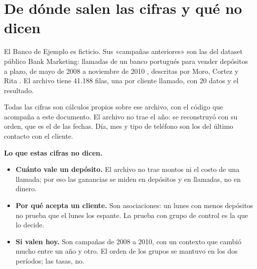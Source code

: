 \documentclass[10pt,a4paper]{article}
\begin{document}
\begin{bloque}
\end{bloque}

\newpage
\section{De dónde salen las cifras y qué no dicen}\label{sec:datos}

El Banco de Ejemplo es ficticio. Sus «campañas anteriores» son las del dataset público
Bank Marketing: llamadas de un banco portugués para vender depósitos a plazo, de mayo de
2008 a noviembre de 2010 , descritas por Moro, Cortez y Rita . El
archivo tiene 41.188 filas, una por cliente llamado, con 20 datos y el resultado.

Todas las cifras son cálculos propios sobre ese archivo, con el código que acompaña a este
documento. El archivo no trae el año: se reconstruyó con su orden, que es el de las
fechas. Día, mes y tipo de teléfono son los del último contacto con el cliente.

\textbf{Lo que estas cifras no dicen.}

\begin{itemize}
\item \textbf{Cuánto vale un depósito.} El archivo no trae montos ni el costo de una llamada;
por eso las ganancias se miden en depósitos y en llamadas, no en dinero.
\item \textbf{Por qué acepta un cliente.} Son asociaciones: un lunes con menos depósitos no
prueba que el lunes los espante. La prueba con grupo de control es la que lo decide.
\item \textbf{Si valen hoy.} Son campañas de 2008 a 2010, con un contexto que cambió mucho
entre un año y otro. El orden de los grupos se mantuvo en los dos períodos; las tasas, no.
\end{itemize}
\end{document}
